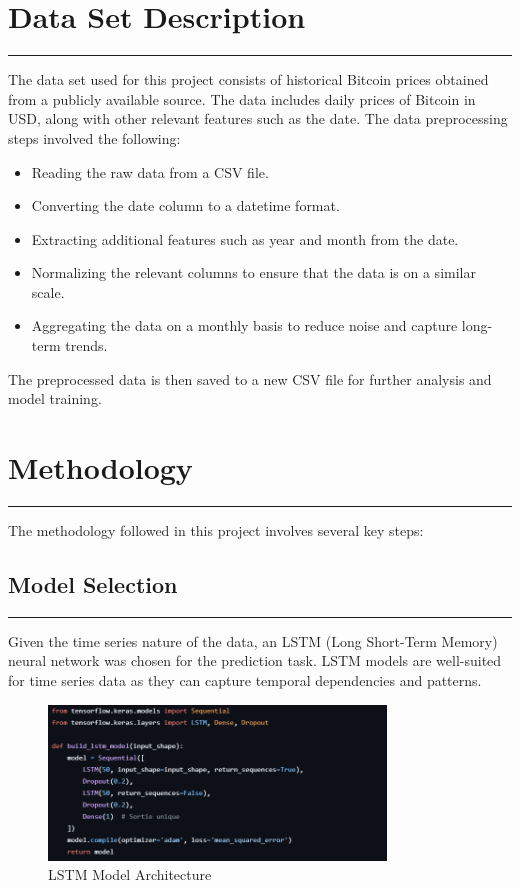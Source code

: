 \documentclass{article}
\begin{document}
\section{Data Set Description}
\noindent\rule{\textwidth}{1pt} %
The data set used for this project consists of historical Bitcoin prices obtained from a publicly available source. The data includes daily prices of Bitcoin in USD, along with other relevant features such as the date. The data preprocessing steps involved the following:
\begin{itemize}
    \item Reading the raw data from a CSV file.
    \item Converting the date column to a datetime format.
    \item Extracting additional features such as year and month from the date.
    \item Normalizing the relevant columns to ensure that the data is on a similar scale.
    \item Aggregating the data on a monthly basis to reduce noise and capture long-term trends.
\end{itemize}
The preprocessed data is then saved to a new CSV file for further analysis and model training.

\section{Methodology}
\noindent\rule{\textwidth}{1pt} %
The methodology followed in this project involves several key steps:
\subsection{Model Selection}
\noindent\rule{\textwidth}{1pt} %
Given the time series nature of the data, an LSTM (Long Short-Term Memory) neural network was chosen for the prediction task. LSTM models are well-suited for time series data as they can capture temporal dependencies and patterns.
\begin{figure}[h]
    \centering
    \includegraphics[width=0.8\textwidth]{img/model}
    \caption{LSTM Model Architecture} %
    \label{fig:model}
\end{figure}
\end{document}
